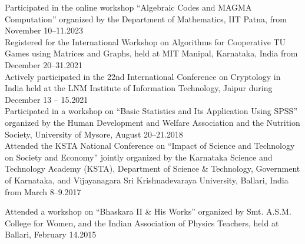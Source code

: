 \documentclass[
	a4paper,
	sidecolor=gray!50,
	sectioncolor=materialblue,
	subsectioncolor=materialindigo,
	profilepicsize=3.5cm,
	profilepicstyle=profilecircle,
	profilepiczoom=1.1,
]{sixtysecondscv}
\begin{document}
\begin{cvtable}
{Participated in the online workshop “Algebraic Codes and MAGMA Computation” organized by the Department of Mathematics, IIT Patna, from November 10--11.}{2023}\\

{Registered for the International Workshop on Algorithms for Cooperative TU Games using Matrices and Graphs, held at MIT Manipal, Karnataka, India from December 20--31.}{2021}\\

        {Actively participated in the 22nd International Conference on Cryptology in India held at the LNM Institute of Information Technology, Jaipur during December 13 -- 15.}{2021}\\ 
        
{Participated in a workshop on ``Basic Statistics and Its Application Using SPSS'' organized by the Human Development and Welfare Association and the Nutrition Society, University of Mysore, August 20--21.}{2018}\\

{Attended the KSTA National Conference on ``Impact of Science and Technology on Society and Economy'' jointly organized by the Karnataka Science and Technology Academy (KSTA), Department of Science \& Technology, Government of Karnataka, and Vijayanagara Sri Krishnadevaraya University, Ballari, India from March 8--9.}{2017}\\   
\end{cvtable}
\begin{cvtable}

{Attended a workshop on ``Bhaskara II \& His Works'' organized by Smt. A.S.M. College for Women, and the Indian Association of Physics Teachers, held at Ballari, February 14.}{2015}     
\end{cvtable}
\end{document}
